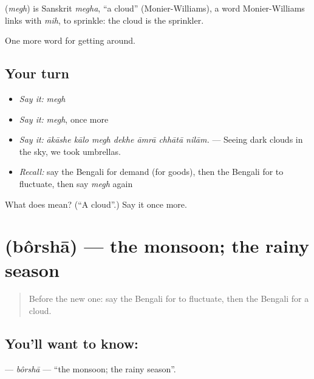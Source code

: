 \begin{cousinweb}
\textbf{} (\emph{megh}) is Sanskrit \emph{megha}, \textquotedblleft{}a cloud\textquotedblright{} (Monier-Williams), a word Monier-Williams links with \emph{mih}, to sprinkle: the cloud is the sprinkler.
\end{cousinweb}

\begin{grammarlens}[title={What you've built}]
One more word for getting around.
\end{grammarlens}

\subsection*{Your turn}
\begin{itemize}
\raggedright
  \item \emph{Say it:} \emph{megh}
  \item \emph{Say it:} \emph{megh}, once more
  \item \emph{Say it:} \emph{ākāshe kālo megh dekhe āmrā chhātā nilām.} — Seeing dark clouds in the sky, we took umbrellas.
  \item \emph{Recall:} say the Bengali for demand (for goods), then the Bengali for to fluctuate, then say \emph{megh} again
\end{itemize}

\begin{tcolorbox}[breakable,colback=teal!4,colframe=teal!35!black,title={Before you move on}]
What does  mean? (\textquotedblleft{}A cloud\textquotedblright{}.) Say it once more.
\end{tcolorbox}
\section[\texorpdfstring{\bn{বর্ষা} (bôrshā)}{বর্ষা (bôrshā)}]{ (bôrshā) — the monsoon; the rainy season}

\label{lesson:BN-C425-borsha}



\begin{quote}
Before the new one: say the Bengali for to fluctuate, then the Bengali for a cloud.
\end{quote}

\subsection*{You'll want to know: }
\textbf{} — \emph{bôrshā} — \textquotedblleft{}the monsoon; the rainy season\textquotedblright{}.

